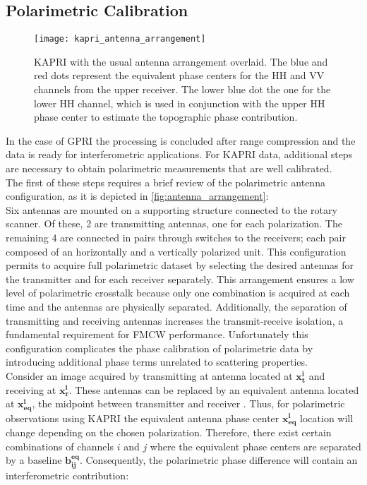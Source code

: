 \subsection{Polarimetric Calibration}\label{sec:proc_polcal}
\begin{figure}[ht]
	\centering
	\texttt{[image: kapri\_antenna\_arrangement]}
	\caption{KAPRI with the usual antenna arrangement overlaid. The blue and red dots represent the equivalent phase centers for the  HH and VV channels from the upper receiver. The lower blue dot the one for the lower HH channel, which is used in conjunction with the upper HH phase center to estimate the topographic phase contribution.}
	\label{fig:antenna_arrangement}
\end{figure}
In the case of GPRI the processing is concluded after range compression and the data is ready for interferometric applications.  For KAPRI data, additional steps are necessary to obtain polarimetric measurements that are well calibrated.\\ The first of these steps requires a brief review of the polarimetric antenna configuration, as it is depicted in \autoref{fig:antenna_arrangement}:\\ Six antennas are mounted on a supporting structure connected to the rotary scanner. Of these, 2 are transmitting antennas, one for each polarization. The remaining 4 are connected in pairs through switches to the receivers; each pair composed of an horizontally and a vertically polarized unit. This configuration permits to acquire full polarimetric dataset by selecting the desired antennas for the transmitter and for each receiver separately. This arrangement ensures a low level of polarimetric crosstalk because only one combination is acquired at each time and the antennas are physically separated. Additionally, the separation of transmitting and receiving antennas increases the transmit-receive isolation, a fundamental requirement for FMCW performance\cite{Beasley1990,Stove1992, Strozzi2011}.  Unfortunately this configuration complicates the phase calibration of polarimetric data by introducing additional phase terms unrelated to scattering properties.\\
Consider an image acquired by transmitting at antenna located at $\mathbf{x_t^i}$ and receiving at $\mathbf{x_r^i}$. These antennas can be replaced by an equivalent antenna located at $\mathbf{x_{eq}^i}$, the midpoint between transmitter and receiver \cite{Pipia2009}. Thus, for polarimetric observations using  KAPRI the equivalent antenna phase center $\mathbf{x_{eq}^i}$ location will change depending on the chosen polarization. Therefore, there exist certain combinations of channels $i$ and $j$ where the equivalent phase centers are separated by a baseline $\mathbf{b_{ij}^{eq}}$. Consequently, the polarimetric phase difference   will contain an interferometric contribution:
